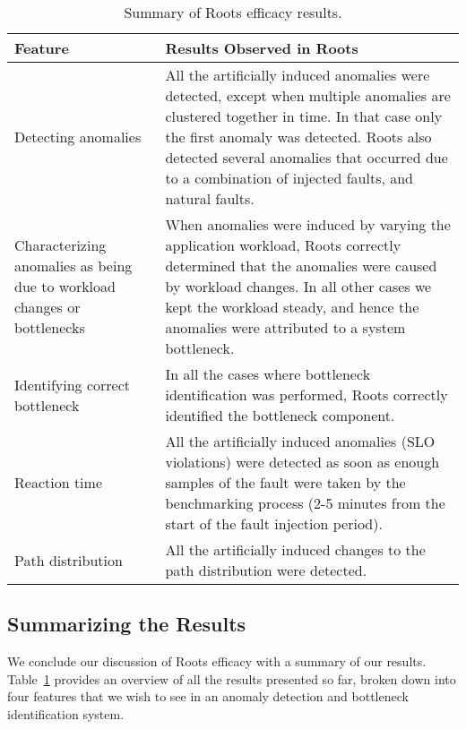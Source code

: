 \begin{table}
\begin{center}
\begin{tabular}{|p{2cm}|p{6cm}|}
\hline
Feature & Results Observed in Roots \\ \hline
Detecting anomalies & 
All the artificially induced anomalies were detected, except when multiple anomalies are
clustered together in time. In that case only the first anomaly was detected.
Roots also detected several anomalies that occurred
due to a combination of injected faults, and natural faults. \\ \hline
Characterizing anomalies as
being due to workload changes or bottlenecks &
When anomalies were induced by varying the application workload, Roots correctly determined
that the anomalies were caused by workload changes. In all other cases
we kept the workload steady, and hence the anomalies were attributed to a
system bottleneck. \\ \hline
Identifying correct bottleneck & 
In all the cases where bottleneck identification was performed, Roots correctly identified 
the bottleneck component. \\ \hline
Reaction time & 
All the artificially induced anomalies (SLO violations) were detected as soon as enough samples of the fault
were taken by the benchmarking process (2-5 minutes from the start of the fault injection period). \\ \hline
Path distribution &
All the artificially induced changes to the path distribution were detected. \\
\hline
\end{tabular}
\end{center}
\caption{Summary of Roots efficacy results.
\label{tab:results_summary}
}
\end{table}

\subsection{Summarizing the Results}
We conclude our discussion of Roots efficacy with a summary of our results. Table~\ref{tab:results_summary}
provides an overview of all the results presented so far, broken down into four features that we wish to see
in an anomaly detection and bottleneck identification system.


